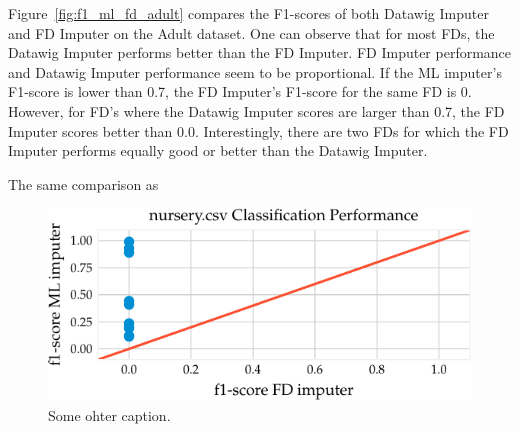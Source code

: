 Figure~\ref{fig:f1_ml_fd_adult} compares the F1-scores of both Datawig Imputer and FD Imputer on the Adult dataset.
One can observe that for most FDs, the Datawig Imputer performs better than the FD Imputer.
FD Imputer performance and Datawig Imputer performance seem to be proportional.
If the ML imputer's F1-score is lower than 0.7, the FD Imputer's F1-score for the same FD is 0.
However, for FD's where the Datawig Imputer scores are larger than 0.7, the FD Imputer scores better than 0.0.
Interestingly, there are two FDs for which the FD Imputer performs equally good or better than the Datawig Imputer.

The same comparison as
 \begin{figure}[h]
     \centering
     \includegraphics[width=.8\textwidth]{../figures/nursery/f1_ml_fd_nursery}
     \caption{Some ohter caption.}
     \label{fig:f1_ml_fd_nursery}
\end{figure}


